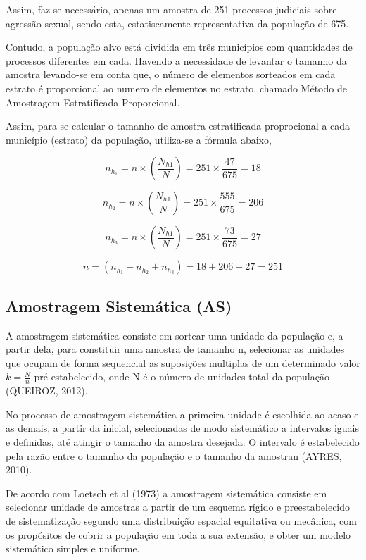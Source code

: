 Assim, faz-se necessário, apenas um amostra de 251 processos judiciais sobre
agressão sexual, sendo esta, estatiscamente representativa da população de 675.
\vskip0.3cm

Contudo, a população alvo está dividida em três municípios com quantidades
de processos diferentes em cada. Havendo a necessidade de levantar o tamanho da
amostra levando-se em conta que, o número de elementos sorteados em cada estrato
é proporcional ao numero de elementos no estrato, chamado Método de Amostragem
Estratificada Proporcional.
\vskip0.3cm

Assim, para se calcular o tamanho de amostra estratificada proprocional a cada
município (estrato) da população, utiliza-se a fórmula abaixo,


$$
n_{h_{1}}= n \times  \left(\frac{N_{h1}}{N} \right)= 251 \times \frac{47}{675}= 18
$$

$$ 	n_{h_{2}}= n \times \left(\frac{N_{h1}}{N} \right)=251 \times \frac{555}{675}= 206 $$

$$ 	n_{h_{3}}= n \times \left(\frac{N_{h1}}{N} \right)= 251 \times \frac{73}{675}= 27 $$

$$ n = \left( n_{h_{1}} + n_{h_{2}} + n_{h_{3}}\right) = 18+206+27 = 251
$$




\subsection{Amostragem Sistemática (AS)}


A amostragem sistemática consiste em sortear uma unidade da população e, a partir dela, para constituir
uma amostra de tamanho n, selecionar as unidades que ocupam de forma sequencial as suposições multiplas
de um determinado valor $k=\frac{N}{n}$ pré-estabelecido, onde N é o número de unidades total da população (QUEIROZ, 2012).\vskip0.3cm

No processo de amostragem sistemática a primeira unidade é escolhida ao acaso e as demais, a partir da inicial, selecionadas de modo sistemático a intervalos iguais e definidas, até atingir o tamanho da amostra desejada. O intervalo é estabelecido pela razão entre o tamanho da população e o tamanho da amostran (AYRES, 2010).\vskip0.3cm

De acordo com Loetsch et al (1973) a amostragem sistemática consiste em selecionar unidade de amostras a partir
de um esquema rígido e preestabelecido de sistematização segundo uma distribuição espacial equitativa ou mecânica, com os propósitos de cobrir a população em toda a sua extensão, e obter um modelo sistemático simples e uniforme.\vskip0.3cm


